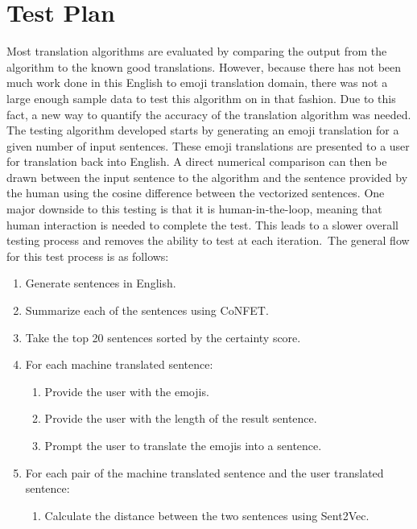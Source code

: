\documentclass{article}[10]
\begin{document}
\section{Test Plan\label{sec:testPlan}}

Most translation algorithms are evaluated by comparing the output from
the algorithm to the known good translations. However, because there has
not been much work done in this English to emoji translation domain,
there was not a large enough sample data to test this algorithm on in
that fashion. Due to this fact, a new way to quantify the accuracy of
the translation algorithm was needed. The testing algorithm developed
starts by generating an emoji translation for a given number of input
sentences. These emoji translations are presented to a user for
translation back into English. A direct numerical comparison can then be
drawn between the input sentence to the algorithm and the sentence
provided by the human using the cosine difference between the vectorized
sentences. One major downside to this testing is that it is
human-in-the-loop, meaning that human interaction is needed to complete
the test. This leads to a slower overall testing process and removes the
ability to test at each iteration.~The general flow for this test
process is as follows:

\begin{enumerate}
\item
  Generate sentences in English.
\item
  Summarize each of the sentences using CoNFET.
\item
  Take the top 20 sentences sorted by the certainty score.
\item
  {For each machine translated sentence:}
    \begin{enumerate}
        \item
          {Provide the user with the emojis.}
        \item
          {Provide the user with the length of the result sentence.}
        \item
          {Prompt the user to translate the emojis into a sentence.}
    \end{enumerate}
\item
  {For each pair of the machine translated sentence and the user
  translated sentence:}
    \begin{enumerate}
      \item
        {Calculate the distance between the two sentences using Sent2Vec.}
    \end{enumerate}
\end{enumerate}
\end{document}

